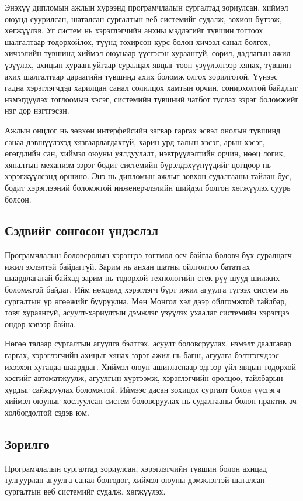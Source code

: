 Энэхүү дипломын ажлын хүрээнд програмчлалын сургалтад зориулсан, хиймэл оюунд суурилсан, шаталсан сургалтын веб системийг судалж, зохион бүтээж, хөгжүүлэв. Уг систем нь хэрэглэгчийн анхны мэдлэгийг түвшин тогтоох шалгалтаар тодорхойлох, түүнд тохирсон курс болон хичээл санал болгох, хичээлийн түвшинд хиймэл оюунаар үүсгэсэн хураангуй, сорил, дадлагын ажил үзүүлэх, ахицын хураангуйгаар суралцах явцыг тоон үзүүлэлтээр хянах, түвшин ахих шалгалтаар дараагийн түвшинд ахих боломж олгох зорилготой. Үүнээс гадна хэрэглэгчдэд харилцан санал солилцох хамтын орчин, сонирхолтой байдлыг нэмэгдүүлэх тоглоомын хэсэг, системийн түвшний чатбот туслах зэрэг боломжийг нэг дор нэгтгэсэн.

Ажлын онцлог нь зөвхөн интерфейсийн загвар гаргах эсвэл онолын түвшинд санаа дэвшүүлэхэд хязгаарлагдахгүй, харин урд талын хэсэг, арын хэсэг, өгөгдлийн сан, хиймэл оюуны уялдуулалт, нэвтрүүлэлтийн орчин, нөөц логик, хяналтын механизм зэрэг бодит системийн бүрэлдэхүүнүүдийг цогцоор нь хэрэгжүүлсэнд оршино. Энэ нь дипломын ажлыг зөвхөн судалгааны тайлан бус, бодит хэрэглээний боломжтой инженерчлэлийн шийдэл болгон хөгжүүлэх суурь болсон.

\subsection*{Сэдвийг сонгосон үндэслэл}
Програмчлалын боловсролын хэрэгцээ тогтмол өсч байгаа боловч бүх суралцагч ижил эхлэлтэй байдаггүй. Зарим нь анхан шатны ойлголтоо бататгах шаардлагатай байхад зарим нь тодорхой технологийн стек рүү шууд шилжих боломжтой байдаг. Ийм нөхцөлд хэрэглэгч бүрт ижил агуулга түгээх систем нь сургалтын үр өгөөжийг бууруулна. Мөн Монгол хэл дээр ойлгомжтой тайлбар, товч хураангуй, асуулт-хариултын дэмжлэг үзүүлэх ухаалаг системийн хэрэгцээ өндөр хэвээр байна.

Нөгөө талаар сургалтын агуулга бэлтгэх, асуулт боловсруулах, нэмэлт даалгавар гаргах, хэрэглэгчийн ахицыг хянах зэрэг ажил нь багш, агуулга бэлтгэгчдээс ихээхэн хугацаа шаарддаг. Хиймэл оюун ашигласнаар эдгээр үйл явцын тодорхой хэсгийг автоматжуулж, агуулгын хүртээмж, хэрэглэгчийн оролцоо, тайлбарын хурдыг сайжруулах боломжтой. Иймээс дасан зохицох сургалт болон үүсгэгч хиймэл оюуныг хослуулсан систем боловсруулах нь судалгааны болон практик ач холбогдолтой сэдэв юм.

\subsection*{Зорилго}
Програмчлалын сургалтад зориулсан, хэрэглэгчийн түвшин болон ахицад тулгуурлан агуулга санал болгодог, хиймэл оюуны дэмжлэгтэй шаталсан сургалтын веб системийг судалж, хөгжүүлэх.

